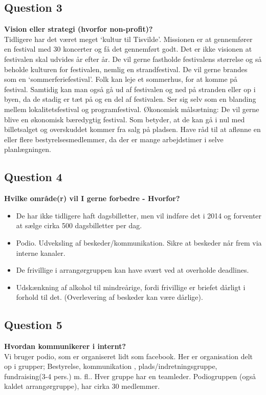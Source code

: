 \subsection{Question 3}
\label{i1q3}
\noindent \textbf{Vision eller strategi (hvorfor non-profit)?} \\
Tidligere har det været meget ‘kultur til Tisvilde’. Missionen er at gennemfører en festival med 30 koncerter og få det gennemført godt. Det er ikke visionen at festivalen skal udvides år efter år. De vil gerne fastholde festivalens størrelse og så beholde kulturen for festivalen, nemlig en strandfestival. De vil gerne brandes som en ‘sommerferiefestival’. Folk kan leje et sommerhus, for at komme på festival. Samtidig kan man også gå ud af festivalen og ned på stranden eller op i byen, da de stadig er tæt på og en del af festivalen. Ser sig selv som en blanding mellem lokalitetsfestival og programfestival.
Økonomisk målsætning: De vil gerne blive en økonomisk bæredygtig festival. Som betyder, at de kan gå i nul med billetsalget og overskuddet kommer fra salg på pladsen. Have råd til at aflønne en eller flere bestyrelsesmedlemmer, da der er mange arbejdstimer i selve planlægningen.

\subsection{Question 4}
\label{i1q4}
\noindent \textbf{Hvilke område(r) vil I gerne forbedre - Hvorfor?} \\
\begin{itemize}
	\item De har ikke tidligere haft dagsbilletter, men vil indføre det i 2014 og forventer at sælge cirka 500 dagsbilletter per dag. 
	\item Podio. Udveksling af beskeder/kommunikation. Sikre at beskeder når frem via interne kanaler. 
	\item De frivillige i arrangørgruppen kan have svært ved at overholde deadlines. 
	\item Udskænkning af alkohol til mindreårige, fordi frivillige er briefet dårligt i forhold til det. (Overlevering af beskeder kan være dårlige).
\end{itemize}

\subsection{Question 5}
\label{i1q5}
\noindent \textbf{Hvordan kommunikerer i internt?} \\
Vi bruger podio, som er organiseret lidt som facebook. Her er organisation delt op i grupper; Bestyrelse, kommunikation , plads/indretningsgruppe, fundraising(3-4 pers.) m. fl.. Hver gruppe har en teamleder. Podiogruppen (også kaldet arrangørgruppe), har cirka 30 medlemmer. 

